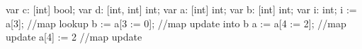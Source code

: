 var c: [int] bool;
var d: [int, int] int;
var a: [int] int;
var b: [int] int;
var i: int;
i := a[3];          //map lookup
b := a[3 := 0];     //map update into b
a := a[4 := 2];     //map update
a[4] := 2           //map update